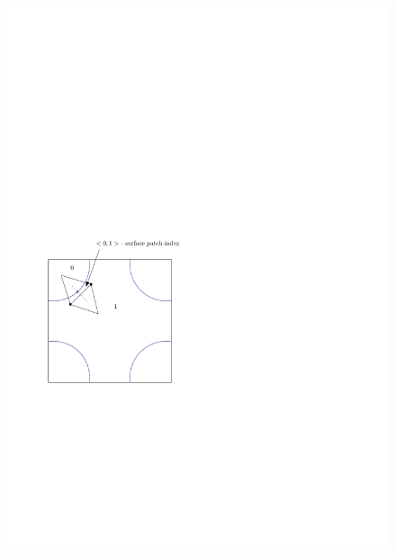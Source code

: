 \documentclass[a4paper,11pt]{article}
\begin{document}
\begin{figure}[h!]
\centerline{\includegraphics[scale=1]{fig/scan_facets.pdf}}
\caption{\label{}}
\end{figure}
\end{document}
